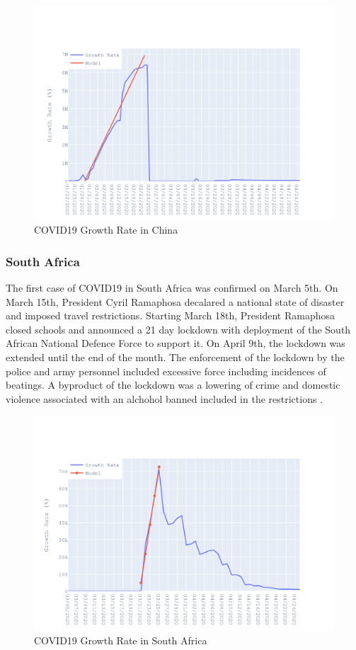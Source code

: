\documentclass{homework}
\begin{document}
\begin{figure}[H]
  \centering
  \includegraphics[scale=0.3]{task3/China.png}
  \caption{COVID19 Growth Rate in China}
\end{figure}

\newpage
\subsubsection{South Africa}

The first case of COVID19 in South Africa was confirmed on March 5th. On March 15th, President Cyril Ramaphosa decalared a national state of disaster and imposed travel restrictions. Starting March 18th, President Ramaphosa closed schools and announced a 21 day lockdown with deployment of the South African National Defence Force to support it. On April 9th, the lockdown was extended until the end of the month. The enforcement of the lockdown by the police and army personnel included excessive force including incidences of beatings. A byproduct of the lockdown was a lowering of crime and domestic violence associated with an alchohol banned included in the restrictions \cite{knoetze_2020}.

\begin{figure}[H]
  \centering
  \includegraphics[scale=0.3]{task3/SouthAfrica.png}
  \caption{COVID19 Growth Rate in South Africa}
\end{figure}
\end{document}
